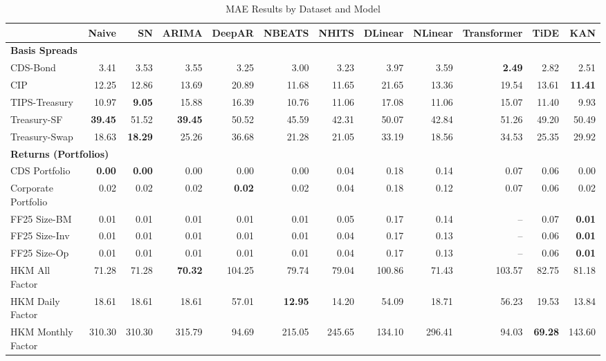 
\begin{table}[htbp]
\centering
\caption{MAE Results by Dataset and Model}
\label{tab:mae_results}
\scriptsize
\setlength{\tabcolsep}{1.5pt}
\renewcommand{\arraystretch}{0.9}
\begin{tabular}{@{}lrrrrrrrrrrr@{}}
\toprule
 & Naive & SN & ARIMA & DeepAR & NBEATS & NHITS & DLinear & NLinear & Transformer & TiDE & KAN \\
\midrule
\multicolumn{12}{l}{\textbf{Basis Spreads}} \\
CDS-Bond & 3.41 & 3.53 & 3.55 & 3.25 & 3.00 & 3.23 & 3.97 & 3.59 & \textbf{2.49} & 2.82 & 2.51 \\
CIP & 12.25 & 12.86 & 13.69 & 20.89 & 11.68 & 11.65 & 21.65 & 13.36 & 19.54 & 13.61 & \textbf{11.41} \\
TIPS-Treasury & 10.97 & \textbf{9.05} & 15.88 & 16.39 & 10.76 & 11.06 & 17.08 & 11.06 & 15.07 & 11.40 & 9.93 \\
Treasury-SF & \textbf{39.45} & 51.52 & \textbf{39.45} & 50.52 & 45.59 & 42.31 & 50.07 & 42.84 & 51.26 & 49.20 & 50.49 \\
Treasury-Swap & 18.63 & \textbf{18.29} & 25.26 & 36.68 & 21.28 & 21.05 & 33.19 & 18.56 & 34.53 & 25.35 & 29.92 \\
\midrule
\multicolumn{12}{l}{\textbf{Returns (Portfolios)}} \\
CDS Portfolio & \textbf{0.00} & \textbf{0.00} & 0.00 & 0.00 & 0.00 & 0.04 & 0.18 & 0.14 & 0.07 & 0.06 & 0.00 \\
Corporate Portfolio & 0.02 & 0.02 & 0.02 & \textbf{0.02} & 0.02 & 0.04 & 0.18 & 0.12 & 0.07 & 0.06 & 0.02 \\
FF25 Size-BM & 0.01 & 0.01 & 0.01 & 0.01 & 0.01 & 0.05 & 0.17 & 0.14 & -- & 0.07 & \textbf{0.01} \\
FF25 Size-Inv & 0.01 & 0.01 & 0.01 & 0.01 & 0.01 & 0.04 & 0.17 & 0.13 & -- & 0.06 & \textbf{0.01} \\
FF25 Size-Op & 0.01 & 0.01 & 0.01 & 0.01 & 0.01 & 0.04 & 0.17 & 0.13 & -- & 0.06 & \textbf{0.01} \\
HKM All Factor & 71.28 & 71.28 & \textbf{70.32} & 104.25 & 79.74 & 79.04 & 100.86 & 71.43 & 103.57 & 82.75 & 81.18 \\
HKM Daily Factor & 18.61 & 18.61 & 18.61 & 57.01 & \textbf{12.95} & 14.20 & 54.09 & 18.71 & 56.23 & 19.53 & 13.84 \\
HKM Monthly Factor & 310.30 & 310.30 & 315.79 & 94.69 & 215.05 & 245.65 & 134.10 & 296.41 & 94.03 & \textbf{69.28} & 143.60 \\

\end{tabular}
\end{table}
